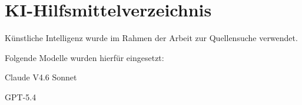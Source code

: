 \newpage
\section*{KI-Hilfsmittelverzeichnis}

Künstliche Intelligenz wurde im Rahmen der Arbeit zur Quellensuche verwendet.

Folgende Modelle wurden hierfür eingesetzt:

\begin{list}{\bullet}{}
	\item{Claude V4.6 Sonnet}
	\item{GPT-5.4}
\end{list}
